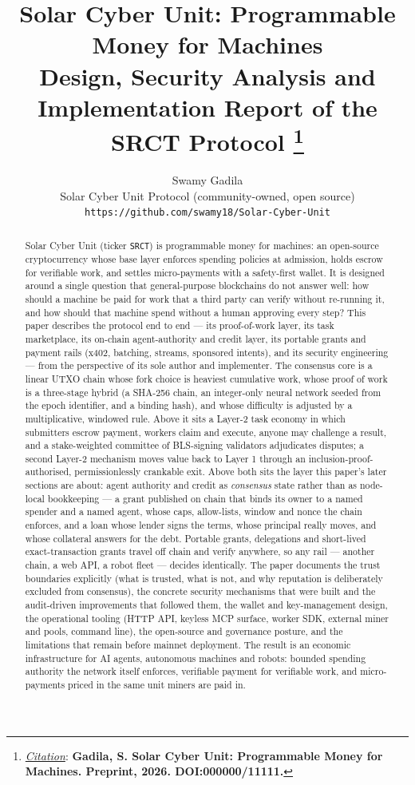 \documentclass{article}
\title{Solar Cyber Unit: Programmable Money for Machines\\
{\large Design, Security Analysis and Implementation Report of the SRCT Protocol}
\thanks{\textit{\underline{Citation}}: 
\textbf{Gadila, S. Solar Cyber Unit: Programmable Money for Machines. Preprint, 2026. DOI:000000/11111.}} 
}
\author{
  Swamy Gadila \\
  Solar Cyber Unit Protocol (community-owned, open source) \\
  \texttt{https://github.com/swamy18/Solar-Cyber-Unit} \\
}
\begin{document}
\maketitle


\begin{abstract}
Solar Cyber Unit (ticker \texttt{SRCT}) is programmable money for machines:
an open-source cryptocurrency whose base layer enforces spending policies at
admission, holds escrow for verifiable work, and settles micro-payments with a
safety-first wallet. It is designed around a single question that
general-purpose blockchains do not answer well: how should a
machine be paid for work that a third party can verify without re-running it,
and how should that machine spend without a human approving every step? This
paper describes the protocol end to end --- its proof-of-work layer, its task
marketplace, its on-chain agent-authority and credit layer, its portable
grants and payment rails (x402, batching, streams, sponsored intents), and its
security engineering --- from the perspective of its sole author and implementer. The
consensus core is a linear UTXO chain whose fork choice is heaviest cumulative
work, whose proof of work is a three-stage hybrid (a SHA-256 chain, an
integer-only neural network seeded from the epoch identifier, and a binding
hash), and whose difficulty is adjusted by a multiplicative, windowed rule. Above
it sits a Layer-2 task economy in which submitters escrow payment, workers claim
and execute, anyone may challenge a result, and a stake-weighted committee of
BLS-signing validators adjudicates disputes; a second Layer-2 mechanism moves
value back to Layer 1 through an inclusion-proof-authorised, permissionlessly
crankable exit. Above both sits the layer this paper's later sections are
about: agent authority and credit as \emph{consensus} state rather than as
node-local bookkeeping --- a grant published on chain that binds its owner to a
named spender and a named agent, whose caps, allow-lists, window and nonce the
chain enforces, and a loan whose lender signs the terms, whose principal
really moves, and whose collateral answers for the debt. Portable grants,
delegations and short-lived exact-transaction grants travel off chain and verify
anywhere, so any rail --- another chain, a web API, a robot fleet --- decides
identically. The paper documents the
trust boundaries explicitly (what is trusted, what is not, and why reputation is
deliberately excluded from consensus),
the concrete security mechanisms that were built and the audit-driven improvements
that followed them, the wallet and key-management design, the operational tooling
(HTTP API, keyless MCP surface, worker SDK, external miner and pools, command line), the open-source and
governance
posture, and the limitations that remain before mainnet deployment. The result
is an economic infrastructure for AI agents, autonomous machines and robots:
bounded spending authority the network itself enforces, verifiable payment for
verifiable work, and micro-payments priced in the same unit miners are paid in.
\end{abstract}
\end{document}
